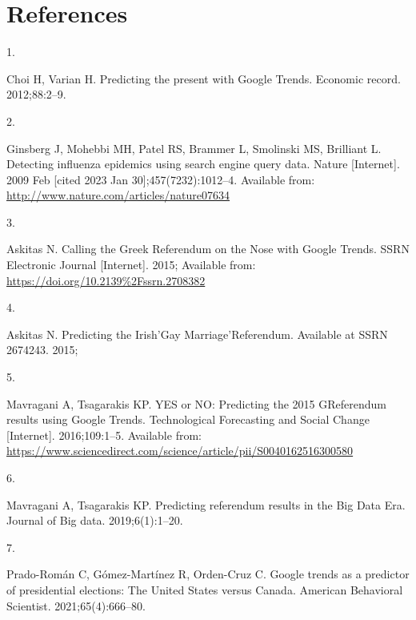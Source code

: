 \documentclass[
  letterpaper,
  DIV=11,
  numbers=noendperiod]{scrartcl}
\newlength{\cslhangindent}
\newlength{\csllabelwidth}
\newlength{\cslentryspacingunit} %
\newenvironment{CSLReferences}[2] %
 {%
  \setlength{\parindent}{0pt}
  \ifodd #1
  \let\oldpar\par
  \def\par{\hangindent=\cslhangindent\oldpar}
  \fi
  \setlength{\parskip}{#2\cslentryspacingunit}
 }%
 {}
\newcommand{\CSLLeftMargin}[1]{\parbox[t]{\csllabelwidth}{#1}}
\newcommand{\CSLRightInline}[1]{\parbox[t]{\linewidth - \csllabelwidth}{#1}\break}
\begin{document}
\hypertarget{references}{%
\section*{References}\label{references}}

\hypertarget{refs}{}
\begin{CSLReferences}{0}{0}
\leavevmode{}%
\CSLLeftMargin{1. }%
\CSLRightInline{Choi H, Varian H. Predicting the present with {Google}
{Trends}. Economic record. 2012;88:2--9. }

\leavevmode{}%
\CSLLeftMargin{2. }%
\CSLRightInline{Ginsberg J, Mohebbi MH, Patel RS, Brammer L, Smolinski
MS, Brilliant L. Detecting influenza epidemics using search engine query
data. Nature {[}Internet{]}. 2009 Feb {[}cited 2023 Jan
30{]};457(7232):1012--4. Available from:
\url{http://www.nature.com/articles/nature07634}}

\leavevmode{}%
\CSLLeftMargin{3. }%
\CSLRightInline{Askitas N. Calling the {Greek} {Referendum} on the
{Nose} with {Google} {Trends}. SSRN Electronic Journal {[}Internet{]}.
2015; Available from: \url{https://doi.org/10.2139\%2Fssrn.2708382}}

\leavevmode{}%
\CSLLeftMargin{4. }%
\CSLRightInline{Askitas N. Predicting the {Irish}'{Gay}
{Marriage}'{Referendum}. Available at SSRN 2674243. 2015; }

\leavevmode{}%
\CSLLeftMargin{5. }%
\CSLRightInline{Mavragani A, Tsagarakis KP. {YES} or {NO}: {Predicting}
the 2015 {GReferendum} results using {Google} {Trends}. Technological
Forecasting and Social Change {[}Internet{]}. 2016;109:1--5. Available
from:
\url{https://www.sciencedirect.com/science/article/pii/S0040162516300580}}

\leavevmode{}%
\CSLLeftMargin{6. }%
\CSLRightInline{Mavragani A, Tsagarakis KP. Predicting referendum
results in the {Big} {Data} {Era}. Journal of Big data. 2019;6(1):1--20.
}

\leavevmode{}%
\CSLLeftMargin{7. }%
\CSLRightInline{Prado-Román C, Gómez-Martínez R, Orden-Cruz C. Google
trends as a predictor of presidential elections: The {United} {States}
versus {Canada}. American Behavioral Scientist. 2021;65(4):666--80. }


\end{CSLReferences}
\end{document}
